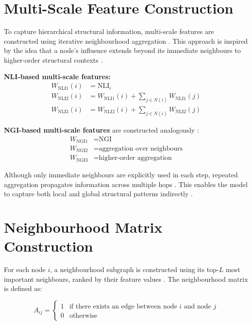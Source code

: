 \section{Multi-Scale Feature Construction}

To capture hierarchical structural information, multi-scale features 
are constructed using iterative neighbourhood aggregation \cite{guo2026, 
tu2025}. This approach is inspired by the idea that a node's influence 
extends beyond its immediate neighbours to higher-order structural 
contexts \cite{zhang2019gcn}.

\noindent \textbf{NLI-based multi-scale features:}
\begin{align}
W_{\text{NLI}1}(i) &= \text{NLI}_i \\
W_{\text{NLI}2}(i) &= W_{\text{NLI}1}(i) + \sum_{j \in N(i)} 
W_{\text{NLI}1}(j) \\
W_{\text{NLI}3}(i) &= W_{\text{NLI}2}(i) + \sum_{j \in N(i)} 
W_{\text{NLI}2}(j)
\end{align}

\noindent \textbf{NGI-based multi-scale features} are constructed 
analogously \cite{guo2026}:
\begin{align}
W_{\text{NGI}1} &= \text{NGI} \\
W_{\text{NGI}2} &= \text{aggregation over neighbours} \\
W_{\text{NGI}3} &= \text{higher-order aggregation}
\end{align}

Although only immediate neighbours are explicitly used in each step, 
repeated aggregation propagates information across multiple hops 
\cite{zhang2019gcn}. This enables the model to capture both 
local and global structural patterns indirectly \cite{guo2026}.

\section{Neighbourhood Matrix Construction}

For each node $i$, a neighbourhood subgraph is constructed using its 
top-$L$ most important neighbours, ranked by their feature values 
\cite{guo2026, tu2025}. The neighbourhood matrix is defined as:

\begin{equation}
A_{ij} =
\begin{cases}
1 & \text{if there exists an edge between node } i \text{ and node } j \\
0 & \text{otherwise}
\end{cases}
\end{equation}

